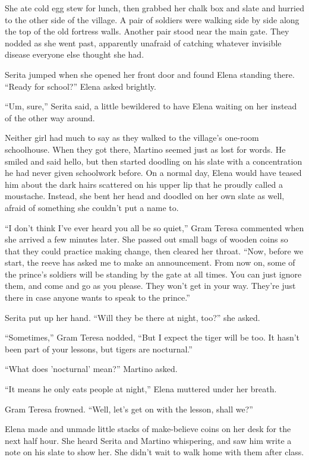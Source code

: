 \documentclass[10pt]{book}
\begin{document}
She ate cold egg stew for lunch, then grabbed her chalk box and slate and hurried to the other side of the village. A pair of soldiers were walking side by side along the top of the old fortress walls. Another pair stood near the main gate. They nodded as she went past, apparently unafraid of catching whatever invisible disease everyone else thought she had.

Serita jumped when she opened her front door and found Elena standing there. ``Ready for school?'' Elena asked brightly.

``Um, sure,'' Serita said, a little bewildered to have Elena waiting on her instead of the other way around.

Neither girl had much to say as they walked to the village's one-room schoolhouse. When they got there, Martino seemed just as lost for words. He smiled and said hello, but then started doodling on his slate with a concentration he had never given schoolwork before. On a normal day, Elena would have teased him about the dark hairs scattered on his upper lip that he proudly called a moustache. Instead, she bent her head and doodled on her own slate as well, afraid of something she couldn't put a name to.

``I don't think I've ever heard you all be so quiet,'' Gram Teresa commented when she arrived a few minutes later. She passed out small bags of wooden coins so that they could practice making change, then cleared her throat.  ``Now, before we start, the reeve has asked me to make an announcement.  From now on, some of the prince's soldiers will be standing by the gate at all times. You can just ignore them, and come and go as you please. They won't get in your way. They're just there in case anyone wants to speak to the prince.''

Serita put up her hand. ``Will they be there at night, too?'' she asked.

``Sometimes,'' Gram Teresa nodded, ``But I expect the tiger will be too. It hasn't been part of your lessons, but tigers are nocturnal.''

``What does 'nocturnal' mean?'' Martino asked.

``It means he only eats people at night,'' Elena muttered under her breath.

Gram Teresa frowned. ``Well, let's get on with the lesson, shall we?''

Elena made and unmade little stacks of make-believe coins on her desk for the next half hour. She heard Serita and Martino whispering, and saw him write a note on his slate to show her. She didn't wait to walk home with them after class.
\end{document}
